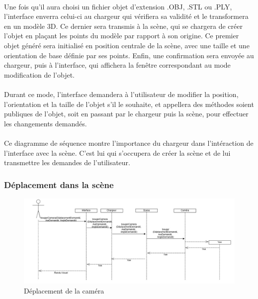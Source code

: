 \paragraph{}
Une fois qu'il aura choisi un fichier objet d'extension .OBJ, .STL ou .PLY, l'interface enverra celui-ci au chargeur qui vérifiera sa validité et le transformera en un modèle 3D. Ce dernier sera transmis à la scène, qui se chargera de créer l'objet en plaçant les points du modèle par rapport à son origine. Ce premier objet généré sera initialisé en position centrale de la scène, avec une taille et une orientation de base définie par ses points. Enfin, une confirmation sera envoyée au chargeur, puis à l'interface, qui affichera la fenêtre correspondant au mode modification de l'objet.

\paragraph{}
Durant ce mode, l'interface demandera à l'utilisateur de modifier la position, l'orientation et la taille de l'objet s'il le souhaite, et appellera des méthodes soient publiques de l'objet, soit en passant par le chargeur puis la scène, pour effectuer les changements demandés.

\paragraph{}
Ce diagramme de séquence montre l'importance du chargeur dans l'intéraction de l'interface avec la scène. C'est lui qui s'occupera de créer la scène et de lui transmettre les demandes de l'utilisateur.


\subsubsection{Déplacement dans la scène}

\begin{figure}[h]
		\centering
		\includegraphics[scale=0.4]{bougerCamera.jpg}
		\caption{\label{fig:deplacementCam} Déplacement de la caméra}
\end{figure}

